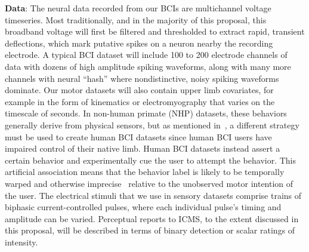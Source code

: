 \documentclass[12pt,oneside]{report}
\begin{document}
\textbf{Data}:
The neural data recorded from our BCIs are multichannel voltage timeseries. Most traditionally, and in the majority of this proposal, this broadband voltage will first be filtered and thresholded to extract rapid, transient deflections, which mark putative spikes on a neuron nearby the recording electrode. A typical BCI dataset will include 100 to 200 electrode channels of data with dozens of high amplitude spiking waveforms, along with many more channels with neural “hash” where nondistinctive, noisy spiking waveforms dominate. Our motor datasets will also contain upper limb covariates, for example in the form of kinematics or electromyography that varies on the timescale of seconds. In non-human primate (NHP) datasets, these behaviors generally derive from physical sensors, but as mentioned in~, a different strategy must be used to create human BCI datasets since human BCI users have impaired control of their native limb. Human BCI datasets instead assert a certain behavior and experimentally cue the user to attempt the behavior. This artificial association means that the behavior label is likely to be temporally warped and otherwise imprecise~\citep{merel2016neuroprosthetic} relative to the unobserved motor intention of the user.
The electrical stimuli that we use in sensory datasets comprise trains of biphasic current-controlled pulses, where each individual pulse’s timing and amplitude can be varied. Perceptual reports to ICMS, to the extent discussed in this proposal, will be described in terms of binary detection or scalar ratings of intensity.
\end{document}

